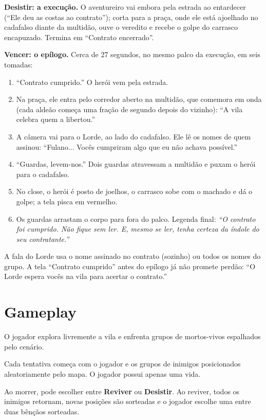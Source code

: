 \documentclass[11pt,a4paper]{article}
\begin{document}
\textbf{Desistir: a execução.} O aventureiro vai embora pela estrada ao entardecer (``Ele deu as costas ao contrato''); corta para a praça, onde ele está ajoelhado no cadafalso diante da multidão, ouve o veredito e recebe o golpe do carrasco encapuzado. Termina em ``Contrato encerrado''.

\textbf{Vencer: o epílogo.} Cerca de 27 segundos, no mesmo palco da execução, em seis tomadas:
\begin{enumerate}
    \item ``Contrato cumprido.'' O herói vem pela estrada.
    \item Na praça, ele entra pelo corredor aberto na multidão, que comemora em onda (cada aldeão começa uma fração de segundo depois do vizinho): ``A vila celebra quem a libertou.''
    \item A câmera vai para o Lorde, ao lado do cadafalso. Ele lê os nomes de quem assinou: ``Fulano... Vocês cumpriram algo que eu não achava possível.''
    \item ``Guardas, levem-nos.'' Dois guardas atravessam a multidão e puxam o herói para o cadafalso.
    \item No close, o herói é posto de joelhos, o carrasco sobe com o machado e dá o golpe; a tela pisca em vermelho.
    \item Os guardas arrastam o corpo para fora do palco. Legenda final: \emph{``O contrato foi cumprido. Não fique sem ler. E, mesmo se ler, tenha certeza da índole do seu contratante.''}
\end{enumerate}
A fala do Lorde usa o nome assinado no contrato (sozinho) ou todos os nomes do grupo. A tela ``Contrato cumprido'' antes do epílogo já não promete perdão: ``O Lorde espera vocês na vila para acertar o contrato.''

\section{Gameplay}

O jogador explora livremente a vila e enfrenta grupos de mortos-vivos espalhados pelo cenário.

Cada tentativa começa com o jogador e os grupos de inimigos posicionados aleatoriamente pelo mapa. O jogador possui apenas uma vida.

Ao morrer, pode escolher entre \textbf{Reviver} ou \textbf{Desistir}. Ao reviver, todos os inimigos retornam, novas posições são sorteadas e o jogador escolhe uma entre duas bênçãos sorteadas.
\end{document}

